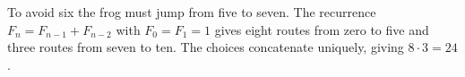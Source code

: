 To avoid six the frog must jump from five to seven. The recurrence $F_n=F_{n-1}+F_{n-2}$ with $F_0=F_1=1$ gives eight routes from zero to five and three routes from seven to ten. The choices concatenate uniquely, giving $8\cdot3=\boxed{24}$.
